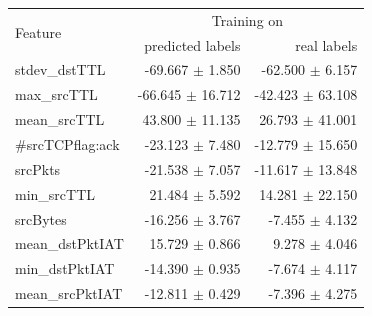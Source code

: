 \documentclass[sigconf,nonacm]{acmart}
\begin{document}
\begin{table}
\begin{tabular}{l r r}
\bottomrule
\end{tabular} \qquad
 \begin{tabular}{l r r} \toprule 
\multirow{2}{*}{Feature} & \multicolumn{2}{c}{Training on} \\
  & predicted labels & real labels \\ \midrule
        stdev\_dstTTL &  -69.667 $\pm$ 1.850 &  -62.500 $\pm$ 6.157 \\
         max\_srcTTL &  -66.645 $\pm$ 16.712 &  -42.423 $\pm$ 63.108 \\
        mean\_srcTTL &   43.800 $\pm$ 11.135 &   26.793 $\pm$ 41.001 \\
    \#srcTCPflag:ack &  -23.123 $\pm$ 7.480 &  -12.779 $\pm$ 15.650 \\
             srcPkts &  -21.538 $\pm$ 7.057 &  -11.617 $\pm$ 13.848 \\
         min\_srcTTL &   21.484 $\pm$ 5.592 &   14.281 $\pm$ 22.150 \\
            srcBytes &  -16.256 $\pm$ 3.767 &   -7.455 $\pm$ 4.132 \\
     mean\_dstPktIAT &   15.729 $\pm$ 0.866 &    9.278 $\pm$ 4.046 \\
      min\_dstPktIAT &  -14.390 $\pm$ 0.935 &   -7.674 $\pm$ 4.117 \\
     mean\_srcPktIAT &  -12.811 $\pm$ 0.429 &   -7.396 $\pm$ 4.275 \\

\end{tabular}
\end{table}
\end{document}
